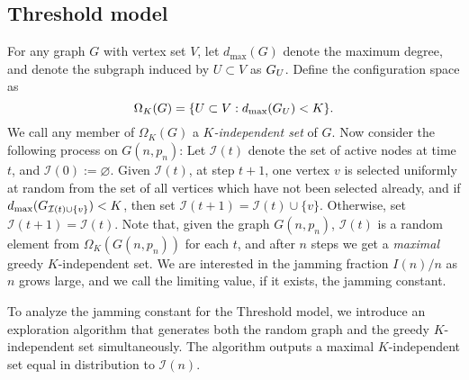 \documentclass[11pt,a4paper, reqno]{article}
\begin{document}
\subsection{Threshold model}
For any graph $G$ with vertex set $V$, let $d_{\max}(G)$ denote the maximum degree, and denote the subgraph induced by $U\subset V$ as $G_{{\scriptscriptstyle} U}$. Define the configuration space as
\begin{equation}
\Omega_K(G)=\{U\subset V:d_{\max}(G_{{\scriptscriptstyle} U})<K\}.
\end{equation}
We call any member of  $\Omega_K(G)$ a \emph{$K$-independent set} of $G$.
Now consider the following process on $G(n,p_n)$: Let $\mathcal{I}(t)$ denote the set of active nodes at time $t$, and $\mathcal{I}(0):=\varnothing$. Given $\mathcal{I}(t)$, at step $t+1$, one vertex $v$ is selected uniformly at random from the set of all vertices which have not been selected already, and if $d_{\max}(G_{{\scriptscriptstyle} \mathcal{I}(t)\cup \{v\}})<K$, then set $\mathcal{I}(t+1)=\mathcal{I}(t)\cup\{v\}$. Otherwise, set $\mathcal{I}(t+1)=\mathcal{I}(t).$
Note that, given the graph $G(n,p_n)$, $\mathcal{I}(t)$ is a random element from $\Omega_K(G(n,p_n))$ for each $t$, and after $n$ steps we get a \emph{maximal} greedy $K$-independent set. 
We are interested in the jamming fraction $I(n)/n$ as $n$ grows large, and we call the limiting value, if it exists, the jamming constant.

To analyze the jamming constant for the Threshold model, we introduce an exploration algorithm that generates both the random graph and the greedy $K$-independent set simultaneously. The algorithm outputs a maximal $K$-independent set equal in distribution to $\mathcal{I}(n)$.
\end{document}
